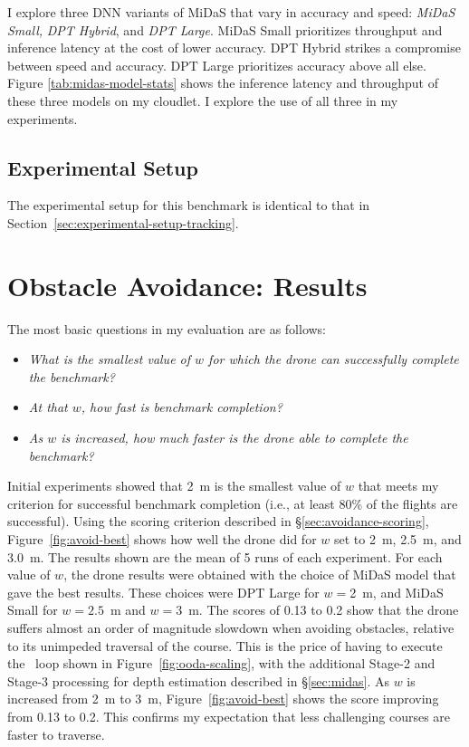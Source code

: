 I explore three DNN variants of MiDaS that vary in accuracy and speed:
{\em MiDaS Small,} {\em DPT Hybrid}, and {\em DPT Large}.  MiDaS Small
prioritizes throughput and inference latency at the cost of lower
accuracy. DPT Hybrid strikes a compromise between speed and accuracy.
DPT Large prioritizes accuracy above all else.  Figure
\ref{tab:midas-model-stats} shows the inference latency and throughput
of these three models on my cloudlet.  I explore the use of all three in my experiments.

\subsection{Experimental Setup}
The experimental setup for this benchmark is identical to that in Section~\ref{sec:experimental-setup-tracking}.

\section{Obstacle Avoidance: Results}
\label{sec:avoidance-results}
The most basic questions in my evaluation are as follows:
\begin{itemize}
\item{\em What is the smallest value of $w$ for which the drone can
    successfully complete the benchmark?}

\item{\em At that $w$, how fast is benchmark completion?}

\item{\em As $w$ is increased, how much faster is the drone able to
    complete the benchmark?}
\end{itemize}

Initial experiments showed that 2~m is the smallest value of $w$
that meets my criterion for successful benchmark completion (i.e., at
least 80\% of the flights are successful).  Using the scoring
criterion described in \S\ref{sec:avoidance-scoring},
Figure~\ref{fig:avoid-best} shows how well the drone
 did for $w$ set
to 2~m, 2.5~m, and 3.0~m.  The results shown are the mean of 5 runs of
each experiment.  For each value of $w$, the drone results were
obtained with the choice of MiDaS model that gave the best results.
These choices were DPT Large for $w = $2~m, and MiDaS Small for $w =
2.5$~m and $w = 3$~m.  The scores of 0.13 to 0.2 show that the drone
suffers almost an order of magnitude slowdown when avoiding obstacles,
relative to its unimpeded traversal of the course.  This is the price
of having to execute the \ooda~loop shown in
Figure~\ref{fig:ooda-scaling}, with the additional Stage-2 and Stage-3
processing for depth estimation described in \S\ref{sec:midas}.  As
$w$ is increased from 2~m to 3~m, Figure~\ref{fig:avoid-best} shows
the score improving from 0.13 to 0.2.  This confirms my expectation
that less challenging courses are faster to traverse.

